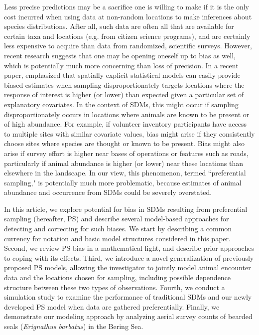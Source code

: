 \documentclass[times,mee,doublespace,]{besauth2}
\begin{document}
Less precise predictions may be a sacrifice one is willing to make if it is the only cost incurred when using data at non-random locations to make inferences about species distributions.  After all, such data are often all that are available for certain taxa and locations (e.g. from citizen science programs), and are certainly less expensive to acquire than data from randomized, scientific surveys.  However, recent research suggests that one may be opening oneself up to bias as well, which is potentially much more concerning than loss of precision. In a recent paper, \citet{DiggleEtAl2010} emphasized that spatially explicit statistical models can easily provide biased estimates when sampling disproportionately targets locations where the response of interest is higher (or lower) than expected given a particular set of explanatory covariates.  In the context of SDMs, this might occur if sampling disproportionately occurs in locations where animals are known to be present or of high abundance. For example, if volunteer inventory participants have access to multiple sites with similar covariate values, bias might arise if they consistently choose sites where species are thought or known to be present.  Bias might also arise if survey effort is higher near bases of operations or features such as roads, particularly if animal abundance is higher (or lower) near these locations than elsewhere in the landscape.  In our view, this phenomenon, termed ``preferential sampling," is potentially much more problematic, because estimates of animal abundance and occurrence from SDMs could be severely overstated.

In this article, we explore potential for bias in SDMs resulting from preferential sampling (hereafter, PS) and describe several model-based approaches for detecting and correcting for such biases.  We start by describing a common currency for notation and basic model structures considered in this paper.  Second, we review PS bias in a mathematical light, and describe prior approaches to coping with its effects. Third, we introduce a novel generalization of previously proposed PS models, allowing the investigator to jointly model animal encounter data and the locations chosen for sampling, including possible dependence structure between these two types of observations.  Fourth, we conduct a simulation study to examine the performance of traditional SDMs and our newly developed PS model when data are gathered preferentially.  Finally, we demonstrate our modeling approach by analyzing aerial survey counts of bearded seals (\textit{Erignathus barbatus}) in the Bering Sea.
\end{document}
